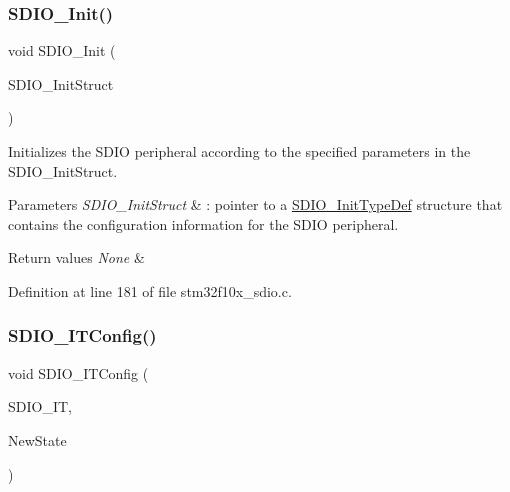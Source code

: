 \subsubsection{\texorpdfstring{S\+D\+I\+O\+\_\+\+Init()}{SDIO\_Init()}}
{\footnotesize\ttfamily void S\+D\+I\+O\+\_\+\+Init (\begin{DoxyParamCaption}\item[{\hyperlink{struct_s_d_i_o___init_type_def}{S\+D\+I\+O\+\_\+\+Init\+Type\+Def} $\ast$}]{S\+D\+I\+O\+\_\+\+Init\+Struct }\end{DoxyParamCaption})}



Initializes the S\+D\+IO peripheral according to the specified parameters in the S\+D\+I\+O\+\_\+\+Init\+Struct. 


\begin{DoxyParams}{Parameters}
{\em S\+D\+I\+O\+\_\+\+Init\+Struct} & \+: pointer to a \hyperlink{struct_s_d_i_o___init_type_def}{S\+D\+I\+O\+\_\+\+Init\+Type\+Def} structure that contains the configuration information for the S\+D\+IO peripheral. \\
\hline
\end{DoxyParams}

\begin{DoxyRetVals}{Return values}
{\em None} & \\
\hline
\end{DoxyRetVals}


Definition at line 181 of file stm32f10x\+\_\+sdio.\+c.

\mbox{\label{group___s_d_i_o___private___functions_ga208f51237ef43288735829dbaed37f00}} 
\subsubsection{\texorpdfstring{S\+D\+I\+O\+\_\+\+I\+T\+Config()}{SDIO\_ITConfig()}}
{\footnotesize\ttfamily void S\+D\+I\+O\+\_\+\+I\+T\+Config (\begin{DoxyParamCaption}\item[{uint32\+\_\+t}]{S\+D\+I\+O\+\_\+\+IT,  }\item[{\hyperlink{group___exported__types_gac9a7e9a35d2513ec15c3b537aaa4fba1}{Functional\+State}}]{New\+State }\end{DoxyParamCaption})}



